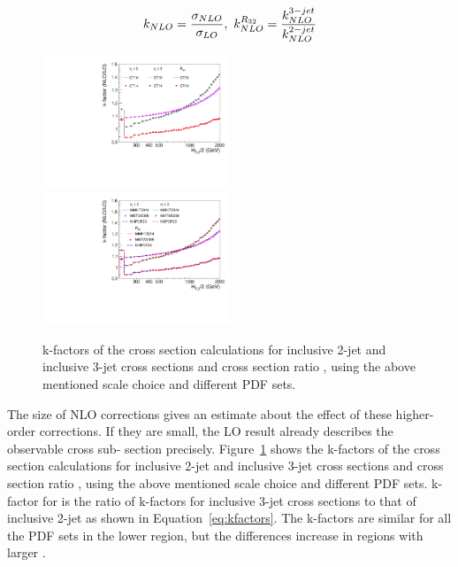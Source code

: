 \begin{equation}
\label{eq:kfactors}
  k_{NLO} = \frac{\sigma_{NLO}}{\sigma_{LO}}, ~k_{NLO}^{\ratio} = \frac{k_{NLO}^{3-jet}}{k_{NLO}^{2-jet}}
\end{equation}

\begin{figure}[!htbp]
  \begin{center}
    \includegraphics[width=0.50\textwidth]{Plots_HT_2_150/Kfactor_all_1.pdf}%
    \includegraphics[width=0.50\textwidth]{Plots_HT_2_150/Kfactor_all_2.pdf}
    \caption{k-factors of the \NLOJETPP cross section calculations for 
      inclusive 2-jet and inclusive 3-jet cross sections and cross section ratio \ratio, using the above mentioned 
      scale choice and different PDF sets.}
    \label{fig:kfactor}
  \end{center}
\end{figure}

The size of NLO corrections gives an estimate about the effect of these higher-order
corrections. If they are small, the LO result already describes the observable cross sub-
section precisely. %
Figure~\ref{fig:kfactor} shows the k-factors of the \NLOJETPP cross section calculations for inclusive 2-jet and inclusive 3-jet cross sections and cross section ratio \ratio, using the above mentioned 
scale choice and different PDF sets. k-factor for \ratio is the ratio of k-factors for inclusive 3-jet cross sections to that of inclusive 2-jet as shown in Equation~\ref{eq:kfactors}. The k-factors are similar for all the PDF sets in the lower region, but the differences increase in regions with larger \httwo.


